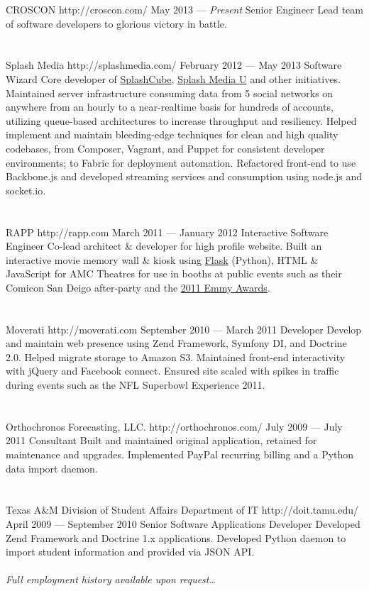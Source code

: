 \documentclass{resume}
\begin{document}
\employer
	{CROSCON}
	{http://croscon.com/}
	{May 2013 --- \emph{Present}}
	{Senior Engineer}
	{Lead team of software developers to glorious victory in battle.}
\\ \\ \\
\employer
	{Splash Media}
	{http://splashmedia.com/}
	{February 2012 --- May 2013}
	{Software Wizard}
	{Core developer of \href{http://splashcube.com/}{SplashCube}, \href{http://splashmediau.com/}{Splash Media U} and other initiatives. Maintained server infrastructure consuming data from 5 social networks on anywhere from an hourly to a near-realtime basis for hundreds of accounts, utilizing queue-based architectures to increase throughput and resiliency. Helped implement and maintain bleeding-edge techniques for clean and high quality codebases, from Composer, Vagrant, and Puppet for consistent developer environments; to Fabric for deployment automation. Refactored front-end to use Backbone.js and developed streaming services and consumption using node.js and socket.io.}
\\ \\ \\
\employer
	{RAPP}
	{http://rapp.com}
	{March 2011 --- January 2012}
	{Interactive Software Engineer}
	{Co-lead architect \& developer for high profile website. Built an interactive movie memory wall \& kiosk using \href{http://flask.pocoo.org/}{Flask} (Python), HTML \& JavaScript for AMC Theatres for use in booths at public events such as their Comicon San Deigo after-party and the \href{http://www.accesshollywood.com/backstage-at-the-emmys/emmys-2011-backstage-at-the-hp-touchsmart-gift-lounge-day-1_gallerytab_3129/20}{2011 Emmy Awards}.}
\\ \\ \\
\employer
	{Moverati}
	{http://moverati.com}
	{September 2010 --- March 2011}
	{Developer}
	{Develop and maintain web presence using Zend Framework, Symfony DI, and Doctrine 2.0. Helped migrate storage to Amazon S3. Maintained front-end interactivity with jQuery and Facebook connect. Ensured site scaled with spikes in traffic during events such as the NFL Superbowl Experience 2011.}
\\ \\ \\
\employer
	{Orthochronos Forecasting, LLC.}
	{http://orthochronos.com/}
	{July 2009 --- July 2011}
	{Consultant}
	{Built and maintained original application, retained for maintenance and upgrades. Implemented PayPal recurring billing and a Python data import daemon.}
\\ \\ \\
\employer
	{Texas A\&M Division of Student Affairs Department of IT}
	{http://doit.tamu.edu/}
	{April 2009 --- September 2010}
	{Senior Software Applications Developer}
	{Developed Zend Framework and Doctrine 1.x applications. Developed Python daemon to import student information and provided via JSON API.}
\\ \\
\emph{Full employment history available upon request\ldots}
\end{document}

